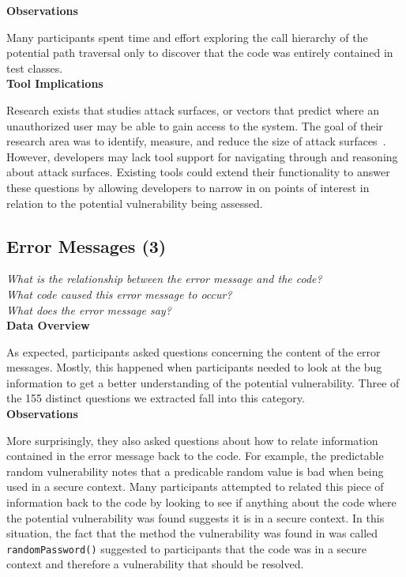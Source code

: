 \documentclass[conference]{IEEEtran}
\begin{document}
\noindent\textbf{Observations}

Many participants spent time and effort exploring the call hierarchy of the potential path traversal only to discover that the code was entirely contained in test classes.
\\

\noindent\textbf{Tool Implications}

Research exists that studies attack surfaces, or vectors that predict where an unauthorized user may be able to gain access to the system.
The goal of their research area was to identify, measure, and reduce the size of attack surfaces~\cite{manadhata2011attack, bartel2012automatically}. 
However, developers may lack tool support for navigating through and reasoning about attack surfaces.
Existing tools could extend their functionality to answer these questions by allowing developers to narrow in on points of interest in relation to the potential vulnerability being assessed.



\noindent\subsection{\textbf{Error Messages (3)}}\label{em}

\noindent\emph{What is the relationship between the error message and the code?} \\
\emph{What code caused this error message to occur?} \\
\emph{What does the error message say?} \\


\noindent\textbf{Data Overview}

As expected, participants asked questions concerning the content of the error messages. 
Mostly, this happened when participants needed to look at the bug information to get a better understanding of the potential vulnerability. 
Three of the 155 distinct questions we extracted fall into this category.
\\

\noindent\textbf{Observations}

More surprisingly, they also asked questions about how to relate information contained in the error message back to the code. 
For example, the predictable random vulnerability notes that a predicable random value is bad when being used in a secure context. 
Many participants attempted to related this piece of information back to the code by looking to see if anything about the code where the potential vulnerability was found suggests it is in a secure context. 
In this situation, the fact that the method the vulnerability was found in was called \texttt{randomPassword()} suggested to participants that the code was in a secure context and therefore a vulnerability that should be resolved.
\end{document}
